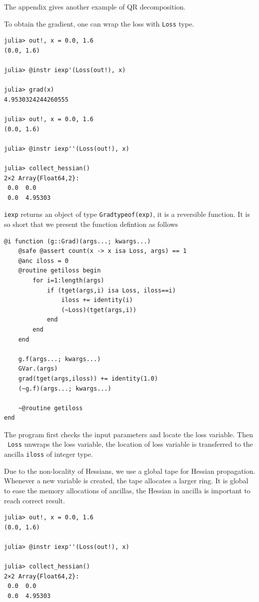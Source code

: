 \documentclass[aps,twocolumn,longbibliography,english,superscriptaddress,prr]{revtex4-1}
\newcommand{\<}{\langle}
\renewcommand{\>}{\rangle}
\begin{document}
The appendix gives another example of QR decomposition.

To obtain the gradient, one can wrap the loss with \texttt{Loss} type.

\begin{minipage}{.44\textwidth}
\begin{lstlisting}
julia> out!, x = 0.0, 1.6
(0.0, 1.6)

julia> @instr iexp'(Loss(out!), x)

julia> grad(x)
4.9530324244260555

julia> out!, x = 0.0, 1.6
(0.0, 1.6)

julia> @instr iexp''(Loss(out!), x)

julia> collect_hessian()
2×2 Array{Float64,2}:
 0.0  0.0
 0.0  4.95303
\end{lstlisting}
\end{minipage}

\texttt{iexp\textquotesingle} returns an object of type \texttt{Grad{typeof(exp)}}, it is a reversible function.
It is so short that we present the function defintion as follows

\begin{minipage}{.44\textwidth}
\begin{lstlisting}
@i function (g::Grad)(args...; kwargs...)
    @safe @assert count(x -> x isa Loss, args) == 1
    @anc iloss = 0
    @routine getiloss begin
        for i=1:length(args)
            if (tget(args,i) isa Loss, iloss==i)
                iloss += identity(i)
                (~Loss)(tget(args,i))
            end
        end
    end

    g.f(args...; kwargs...)
    GVar.(args)
    grad(tget(args,iloss)) += identity(1.0)
    (~g.f)(args...; kwargs...)

    ~@routine getiloss
end
\end{lstlisting}
\end{minipage}

The program first checks the input parameters and locate the loss variable.
Then \texttt{~Loss} unwraps the loss variable, the location of loss variable is transferred to the ancilla \texttt{iloss} of integer type.

Due to the non-locality of Hessians, we use a global tape for Hessian propagation. Whenever a new variable is created, the tape allocates a larger ring.
It is global to ease the memory allocations of ancillas, the Hessian in ancilla is important to reach correct result.
\begin{minipage}{.44\textwidth}
\begin{lstlisting}
julia> out!, x = 0.0, 1.6
(0.0, 1.6)

julia> @instr iexp''(Loss(out!), x)

julia> collect_hessian()
2×2 Array{Float64,2}:
 0.0  0.0
 0.0  4.95303
\end{lstlisting}
\end{minipage}
\end{document}
